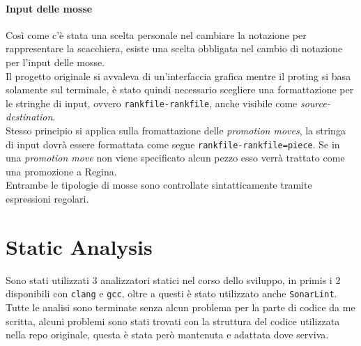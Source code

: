 \documentclass{article}
\begin{document}
        \paragraph{Input delle mosse}
            Così come c'è stata una scelta personale nel cambiare la notazione per rappresentare la scacchiera, esiste una scelta obbligata nel cambio di notazione per l'input delle mosse.\\
            Il progetto originale si avvaleva di un'interfaccia grafica mentre il proting si basa solamente sul terminale, è stato quindi necessario scegliere una formattazione per le stringhe di input, ovvero \texttt{rankfile-rankfile}, anche visibile come \textit{source-destination}.\\
            Stesso principio si applica sulla fromattazione delle \textit{promotion moves}, la stringa di input dovrà essere formattata come segue \texttt{rankfile-rankfile=piece}. Se in una \textit{promotion move} non viene specificato alcun pezzo esso verrà trattato come una promozione a Regina.\\
            Entrambe le tipologie di mosse sono controllate sintatticamente tramite espressioni regolari.
    \section{Static Analysis}\label{sec:staticanalysis}
        Sono stati utilizzati 3 analizzatori statici nel corso dello sviluppo, in primis i 2 disponibili con \texttt{clang} e \texttt{gcc}, oltre a questi è stato utilizzato anche \texttt{SonarLint}. Tutte le analisi sono terminate senza alcun problema per la parte di codice da me scritta, alcuni problemi sono stati trovati con la struttura del codice utilizzata nella repo originale, questa è stata però mantenuta e adattata dove serviva.
\end{document}
